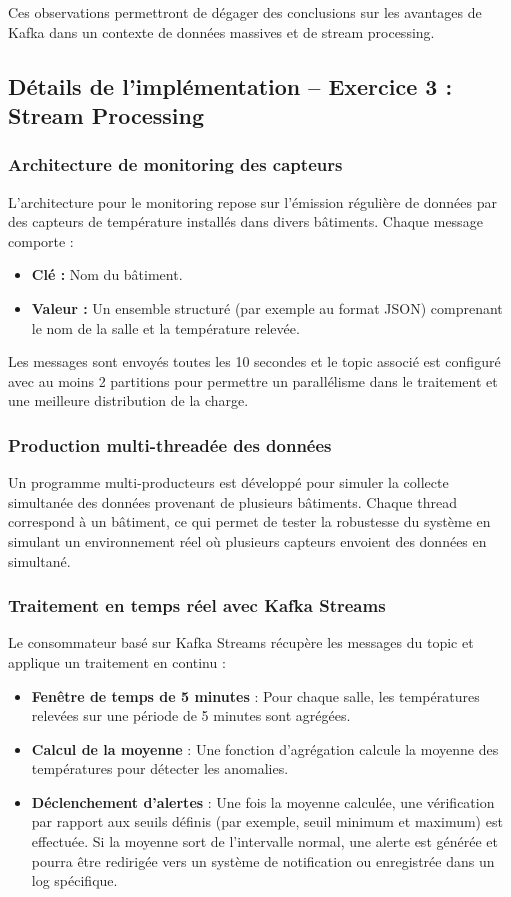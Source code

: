 Ces observations permettront de dégager des conclusions sur les avantages de Kafka dans un contexte de données massives et de stream processing.

\subsection{Détails de l’implémentation – Exercice 3 : Stream Processing}

\subsubsection{Architecture de monitoring des capteurs}
L’architecture pour le monitoring repose sur l’émission régulière de données par des capteurs de température installés dans divers bâtiments. Chaque message comporte :
\begin{itemize}
    \item \textbf{Clé :} Nom du bâtiment.
    \item \textbf{Valeur :} Un ensemble structuré (par exemple au format JSON) comprenant le nom de la salle et la température relevée.
\end{itemize}

Les messages sont envoyés toutes les 10 secondes et le topic associé est configuré avec au moins 2 partitions pour permettre un parallélisme dans le traitement et une meilleure distribution de la charge.

\subsubsection{Production multi-threadée des données}
Un programme multi-producteurs est développé pour simuler la collecte simultanée des données provenant de plusieurs bâtiments. Chaque thread correspond à un bâtiment, ce qui permet de tester la robustesse du système en simulant un environnement réel où plusieurs capteurs envoient des données en simultané.

\subsubsection{Traitement en temps réel avec Kafka Streams}
Le consommateur basé sur Kafka Streams récupère les messages du topic et applique un traitement en continu :
\begin{itemize}
    \item \textbf{Fenêtre de temps de 5 minutes} : Pour chaque salle, les températures relevées sur une période de 5 minutes sont agrégées.
    \item \textbf{Calcul de la moyenne} : Une fonction d’agrégation calcule la moyenne des températures pour détecter les anomalies.
    \item \textbf{Déclenchement d’alertes} : Une fois la moyenne calculée, une vérification par rapport aux seuils définis (par exemple, seuil minimum et maximum) est effectuée. Si la moyenne sort de l’intervalle normal, une alerte est générée et pourra être redirigée vers un système de notification ou enregistrée dans un log spécifique.
\end{itemize}

